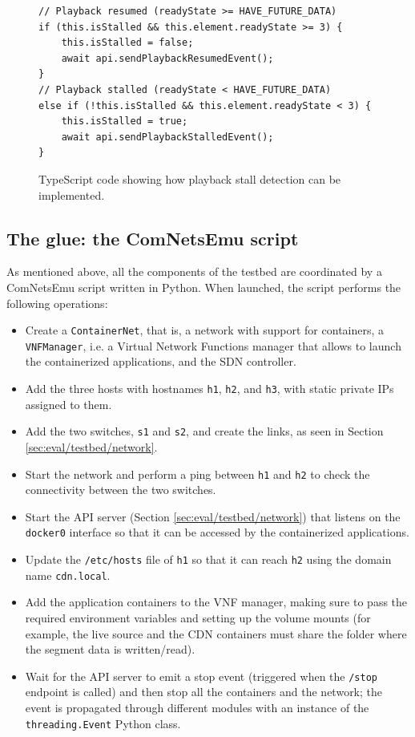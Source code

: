\begin{figure}
    \centering
    \begin{verbatim}
// Playback resumed (readyState >= HAVE_FUTURE_DATA)
if (this.isStalled && this.element.readyState >= 3) {
    this.isStalled = false;
    await api.sendPlaybackResumedEvent();
}
// Playback stalled (readyState < HAVE_FUTURE_DATA)
else if (!this.isStalled && this.element.readyState < 3) {
    this.isStalled = true;
    await api.sendPlaybackStalledEvent();
}
    \end{verbatim}
    \caption{TypeScript code showing how playback stall detection can be implemented.}
    \label{fig:hls_readystate}
\end{figure}

\subsection{The glue: the ComNetsEmu script}
\label{sec:eval/testbed/script}

As mentioned above, all the components of the testbed are coordinated by a ComNetsEmu script written in Python. When launched, the script performs the following operations:

\begin{itemize}
    \item Create a \texttt{ContainerNet}, that is, a network with support for containers, a \texttt{VNFManager}, i.e. a Virtual Network Functions manager that allows to launch the containerized applications, and the SDN controller.
    \item Add the three hosts with hostnames \texttt{h1}, \texttt{h2}, and \texttt{h3}, with static private IPs assigned to them.
    \item Add the two switches, \texttt{s1} and \texttt{s2}, and create the links, as seen in Section \ref{sec:eval/testbed/network}.
    \item Start the network and perform a ping between \texttt{h1} and \texttt{h2} to check the connectivity between the two switches.
    \item Start the API server (Section \ref{sec:eval/testbed/network}) that listens on the \texttt{docker0} interface so that it can be accessed by the containerized applications.
    \item Update the \texttt{/etc/hosts} file of \texttt{h1} so that it can reach \texttt{h2} using the domain name \texttt{cdn.local}.
    \item Add the application containers to the VNF manager, making sure to pass the required environment variables and setting up the volume mounts (for example, the live source and the CDN containers must share the folder where the segment data is written/read).
    \item Wait for the API server to emit a stop event (triggered when the \texttt{/stop} endpoint is called) and then stop all the containers and the network; the event is propagated through different modules with an instance of the \texttt{threading.Event} Python class.
\end{itemize}

